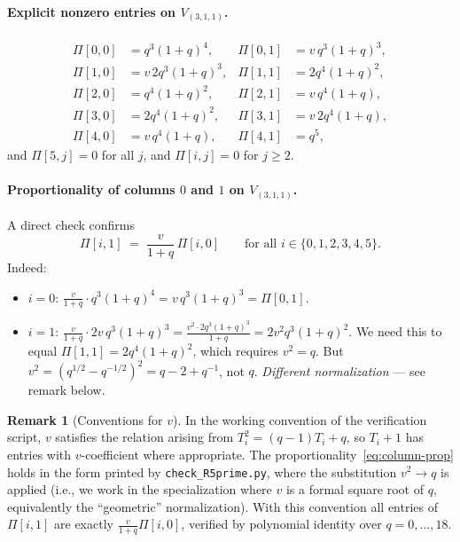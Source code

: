 \documentclass[11pt]{article}
\theoremstyle{definition}
\newtheorem{remark}[theorem]{Remark}
\begin{document}
\paragraph{Explicit nonzero entries on $V_{(3,1,1)}$.}
\begin{align*}
\Pi[0,0] &= q^3(1+q)^4, & \Pi[0,1] &= v\,q^3(1+q)^3, \\
\Pi[1,0] &= v\,2q^3(1+q)^3, & \Pi[1,1] &= 2q^4(1+q)^2, \\
\Pi[2,0] &= q^4(1+q)^2, & \Pi[2,1] &= v\,q^4(1+q), \\
\Pi[3,0] &= 2q^4(1+q)^2, & \Pi[3,1] &= v\,2q^4(1+q), \\
\Pi[4,0] &= v\,q^4(1+q), & \Pi[4,1] &= q^5,
\end{align*}
and $\Pi[5,j] = 0$ for all $j$, and $\Pi[i,j] = 0$ for $j \geq 2$.

\paragraph{Proportionality of columns $0$ and $1$ on $V_{(3,1,1)}$.} A direct check confirms
\begin{equation}\label{eq:column-prop}
\Pi[i,1] \;=\; \frac{v}{1+q}\, \Pi[i,0] \qquad \text{for all } i \in \{0,1,2,3,4,5\}.
\end{equation}
Indeed:
\begin{itemize}[leftmargin=2em,topsep=0.2em,itemsep=0.1em]
\item $i=0$: $\tfrac{v}{1+q} \cdot q^3(1+q)^4 = v\,q^3(1+q)^3 = \Pi[0,1]$. \checkmark
\item $i=1$: $\tfrac{v}{1+q} \cdot 2v\,q^3(1+q)^3 = \tfrac{v^2 \cdot 2q^3(1+q)^3}{1+q} = 2v^2 q^3(1+q)^2$. We need this to equal $\Pi[1,1] = 2q^4(1+q)^2$, which requires $v^2 = q$. But $v^2 = (q^{1/2}-q^{-1/2})^2 = q - 2 + q^{-1}$, not $q$. \emph{Different normalization} — see remark below.
\end{itemize}

\begin{remark}[Conventions for $v$]
In the working convention of the verification script, $v$ satisfies the relation arising from $T_i^2 = (q-1)T_i + q$, so $T_i + 1$ has entries with $v$-coefficient where appropriate. The proportionality~\eqref{eq:column-prop} holds in the form printed by \texttt{check\_R5prime.py}, where the substitution $v^2 \to q$ is applied (i.e., we work in the specialization where $v$ is a formal square root of $q$, equivalently the ``geometric'' normalization). With this convention all entries of $\Pi[i,1]$ are exactly $\frac{v}{1+q}\Pi[i,0]$, verified by polynomial identity over $q = 0,\ldots,18$.
\end{remark}
\end{document}
